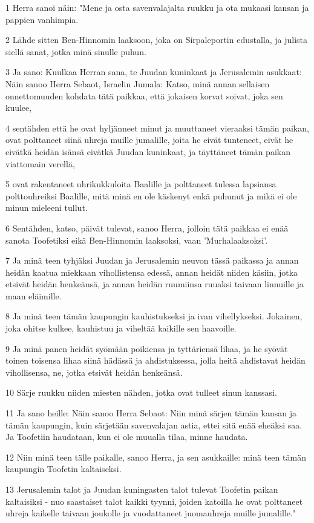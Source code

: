 \par 1 Herra sanoi näin: "Mene ja osta savenvalajalta ruukku ja ota mukaasi kansan ja pappien vanhimpia.
\par 2 Lähde sitten Ben-Hinnomin laaksoon, joka on Sirpaleportin edustalla, ja julista siellä sanat, jotka minä sinulle puhun.
\par 3 Ja sano: Kuulkaa Herran sana, te Juudan kuninkaat ja Jerusalemin asukkaat: Näin sanoo Herra Sebaot, Israelin Jumala: Katso, minä annan sellaisen onnettomuuden kohdata tätä paikkaa, että jokaisen korvat soivat, joka sen kuulee,
\par 4 sentähden että he ovat hyljänneet minut ja muuttaneet vieraaksi tämän paikan, ovat polttaneet siinä uhreja muille jumalille, joita he eivät tunteneet, eivät he eivätkä heidän isänsä eivätkä Juudan kuninkaat, ja täyttäneet tämän paikan viattomain verellä,
\par 5 ovat rakentaneet uhrikukkuloita Baalille ja polttaneet tulessa lapsiansa polttouhreiksi Baalille, mitä minä en ole käskenyt enkä puhunut ja mikä ei ole minun mieleeni tullut.
\par 6 Sentähden, katso, päivät tulevat, sanoo Herra, jolloin tätä paikkaa ei enää sanota Toofetiksi eikä Ben-Hinnomin laaksoksi, vaan 'Murhalaaksoksi'.
\par 7 Ja minä teen tyhjäksi Juudan ja Jerusalemin neuvon tässä paikassa ja annan heidän kaatua miekkaan vihollistensa edessä, annan heidät niiden käsiin, jotka etsivät heidän henkeänsä, ja annan heidän ruumiinsa ruuaksi taivaan linnuille ja maan eläimille.
\par 8 Ja minä teen tämän kaupungin kauhistukseksi ja ivan vihellykseksi. Jokainen, joka ohitse kulkee, kauhistuu ja viheltää kaikille sen haavoille.
\par 9 Ja minä panen heidät syömään poikiensa ja tyttäriensä lihaa, ja he syövät toinen toisensa lihaa siinä hädässä ja ahdistuksessa, jolla heitä ahdistavat heidän vihollisensa, ne, jotka etsivät heidän henkeänsä.
\par 10 Särje ruukku niiden miesten nähden, jotka ovat tulleet sinun kanssasi.
\par 11 Ja sano heille: Näin sanoo Herra Sebaot: Niin minä särjen tämän kansan ja tämän kaupungin, kuin särjetään savenvalajan astia, ettei sitä enää eheäksi saa. Ja Toofetiin haudataan, kun ei ole muualla tilaa, minne haudata.
\par 12 Niin minä teen tälle paikalle, sanoo Herra, ja sen asukkaille: minä teen tämän kaupungin Toofetin kaltaiseksi.
\par 13 Jerusalemin talot ja Juudan kuningasten talot tulevat Toofetin paikan kaltaisiksi - nuo saastaiset talot kaikki tyynni, joiden katoilla he ovat polttaneet uhreja kaikelle taivaan joukolle ja vuodattaneet juomauhreja muille jumalille."

